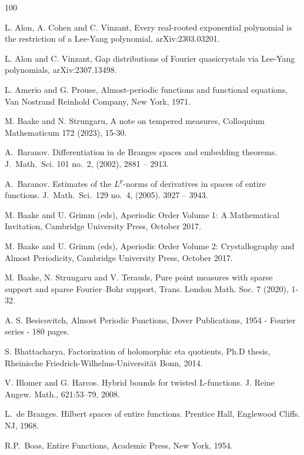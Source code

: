 \documentclass[a4paper,reqno,12pt]{amsart}
\newcommand{\1}{{\bf 1}}
\renewcommand{\1}{{\bo 1}}
\begin{document}
\begin{thebibliography}{100}

L. Alon, A. Cohen and C. Vinzant,
Every real-rooted exponential polynomial is the restriction of a Lee-Yang polynomial, arXiv:2303.03201.

L. Alon and C. Vinzant,
Gap distributions of Fourier quasicrystals via Lee-Yang polynomials, arXiv:2307.13498.

L. Amerio and G. Prouse, Almost-periodic functions and functional equations, Van Nostrand Reinhold Company, New York, 1971.

{M. Baake and N. Strungaru},
A note on tempered measures, Colloquium Mathematicum 172 (2023), 15-30.




 A.\ Baranov. Differentiation in de Branges spaces and embedding theorems. J.\ Math.\ Sci. 101 no.\ 2, (2002), 2881 -- 2913.

 A.\ Baranov. Estimates of the $L^p$-norms of derivatives in spaces of entire functions. J.\ Math.\ Sci.\ 129 no.\ 4, (2005). 3927 -- 3943.

 M. Baake and U. Grimm (eds), Aperiodic Order Volume 1: A Mathematical Invitation, Cambridge University Press, October 2017.

 M. Baake and U. Grimm (eds), Aperiodic Order Volume 2: Crystallography and Almost Periodicity, Cambridge University Press, October 2017.

M. Baake, N. Strungaru and V. Terauds,
Pure point measures with sparse support and sparse Fourier--Bohr support, Trans. London Math. Soc. 7 (2020), 1-32.




A. S. Besicovitch, Almost Periodic Functions, 
Dover Publications, 1954 - Fourier series - 180 pages.

S. Bhattacharya, Factorization of holomorphic eta quotients, Ph.D thesis, Rheinische Friedrich-Wilhelms-Universit\"at Bonn, 2014.

V. Blomer and G. Harcos. Hybrid bounds for twisted L-functions. J. Reine Angew. Math., 621:53–79, 2008.


  
   L.\ de Branges. Hilbert spaces of entire functions. Prentice Hall, Englewood Cliffs. NJ, 1968.
  

  R.P.\ Boas, Entire Functions, Academic Press, New York, 1954.



\end{thebibliography}
\end{document}
